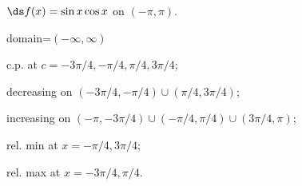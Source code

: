{$\ds f(x) =\sin x\cos x$ on $(-\pi,\pi)$.
}
{domain=$(-\infty,\infty)$

c.p. at $c=-3\pi/4,-\pi/4,\pi/4,3\pi/4$; 

decreasing on $(-3\pi/4,-\pi/4) \cup (\pi/4,3\pi/4)$;

increasing on $(-\pi,-3\pi/4)\cup (-\pi/4,\pi/4) \cup (3\pi/4,\pi)$;

rel. min at $x=-\pi/4,3\pi/4$;

rel. max at $x=-3\pi/4,\pi/4$.
}
